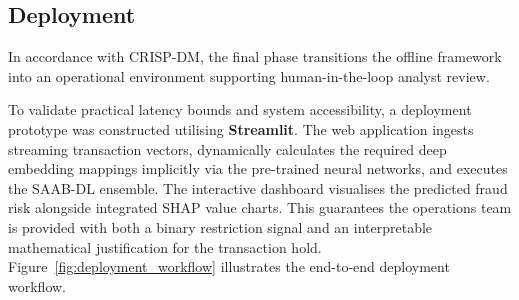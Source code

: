 \documentclass[a4paper,fleqn]{cas-sc}
\begin{document}
\subsection{Deployment}

In accordance with CRISP-DM, the final phase transitions the offline framework into an operational environment supporting human-in-the-loop analyst review.

To validate practical latency bounds and system accessibility, a deployment prototype was constructed utilising \textbf{Streamlit}. The web application ingests streaming transaction vectors, dynamically calculates the required deep embedding mappings implicitly via the pre-trained neural networks, and executes the SAAB-DL ensemble. The interactive dashboard visualises the predicted fraud risk alongside integrated SHAP value charts. This guarantees the operations team is provided with both a binary restriction signal and an interpretable mathematical justification for the transaction hold. Figure~\ref{fig:deployment_workflow} illustrates the end-to-end deployment workflow.
\end{document}
